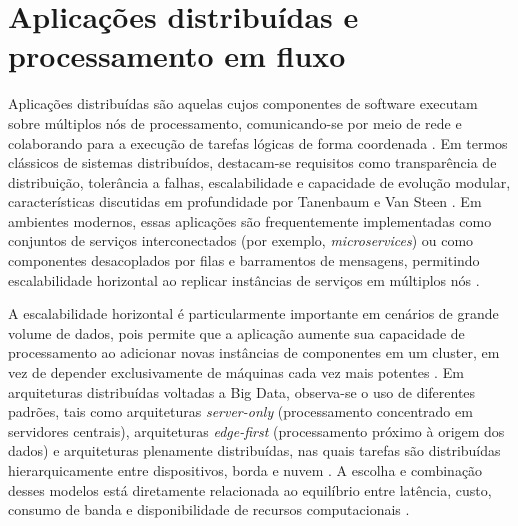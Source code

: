 
\section{Aplicações distribuídas e processamento em fluxo}

Aplicações distribuídas são aquelas cujos componentes de software executam sobre múltiplos nós de processamento, comunicando-se por meio de rede e colaborando para a execução de tarefas lógicas de forma coordenada \cite{tanenbaum2017,burns2019}. Em termos clássicos de sistemas distribuídos, destacam-se requisitos como transparência de distribuição, tolerância a falhas, escalabilidade e capacidade de evolução modular, características discutidas em profundidade por Tanenbaum e Van Steen \cite{tanenbaum2017}. Em ambientes modernos, essas aplicações são frequentemente implementadas como conjuntos de serviços interconectados (por exemplo, \textit{microservices}) ou como componentes desacoplados por filas e barramentos de mensagens, permitindo escalabilidade horizontal ao replicar instâncias de serviços em múltiplos nós \cite{burns2019}.

A escalabilidade horizontal é particularmente importante em cenários de grande volume de dados, pois permite que a aplicação aumente sua capacidade de processamento ao adicionar novas instâncias de componentes em um cluster, em vez de depender exclusivamente de máquinas cada vez mais potentes \cite{tanenbaum2017,burns2019}. Em arquiteturas distribuídas voltadas a Big Data, observa-se o uso de diferentes padrões, tais como arquiteturas \textit{server-only} (processamento concentrado em servidores centrais), arquiteturas \textit{edge-first} (processamento próximo à origem dos dados) e arquiteturas plenamente distribuídas, nas quais tarefas são distribuídas hierarquicamente entre dispositivos, borda e nuvem \cite{alam2020}. A escolha e combinação desses modelos está diretamente relacionada ao equilíbrio entre latência, custo, consumo de banda e disponibilidade de recursos computacionais \cite{alam2020}.

